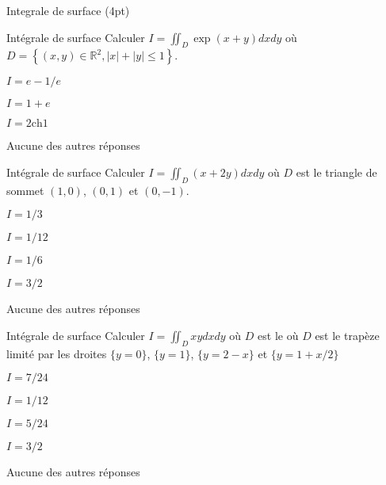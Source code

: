 \documentclass[12pt]{article}
\begin{document}
\begin{quiz}[points=4, shuffle, penalty=.5]
  {Integrale de surface (4pt)}

  \begin{multi}{Int\'{e}grale de surface}
    Calculer $I=\iint_D \exp(x+y) dxdy$ o\`{u} $D=\left\{ (x,y) \in \mathbb R^2, |x| + |y| \leq 1 \right\}$.
  \item* $I=e - 1 /e$
  \item $I=1 + e$
  \item $I=2\text{ch} 1$
  \item Aucune des autres r\'{e}ponses 
  \end{multi}%

  \begin{multi}{Int\'{e}grale de surface}
    Calculer $I=\iint_D (x+2y) dxdy$ o\`{u} $D$ est le triangle de sommet $(1,0)$, $(0,1)$ et $(0,-1)$.
  \item* $I=1/3$
  \item $I=1/12$
  \item $I=1/6$
  \item $I=3/2$
  \item Aucune des autres r\'{e}ponses 
  \end{multi}%


  \begin{multi}{Int\'{e}grale de surface}
    Calculer $I=\iint_D xy dxdy$ o\`{u} $D$ est le o\`{u} $D$ est le trap\`{e}ze limit\'{e} par les droites $\{y = 0\}$, $\{y = 1\}$, $\{y = 2 - x\}$ et $\{y = 1 + x/2\}$ 
  \item* $I=7/24$
  \item $I=1/12$
  \item $I=5/24$
  \item $I=3/2$
  \item Aucune des autres r\'{e}ponses 
  \end{multi}%

\end{quiz}
\end{document}
